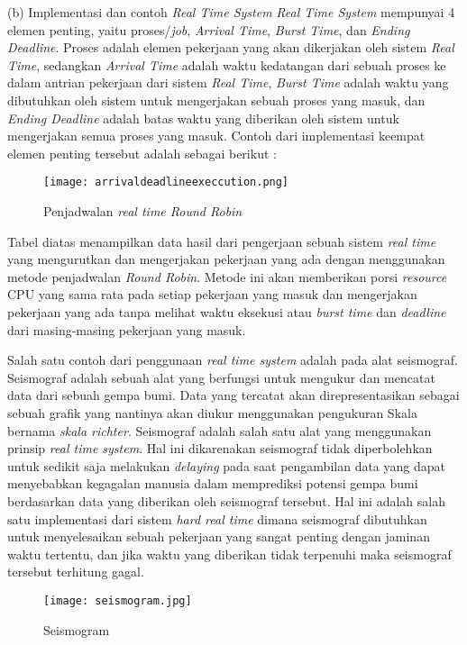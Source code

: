 \documentclass[a4paper,twoside]{article}
\begin{document}
\begin{enumerate}
		(b) Implementasi dan contoh {\it Real Time System}  \newline
		{\it Real Time System} mempunyai 4 elemen penting, yaitu proses/{\it job}, {\it Arrival Time}, {\it Burst Time}, dan {\it Ending Deadline}. Proses adalah elemen pekerjaan yang akan dikerjakan oleh sistem {\it Real Time}, sedangkan {\it Arrival Time} adalah waktu kedatangan dari sebuah proses ke dalam antrian pekerjaan dari sistem {\it Real Time}, {\it Burst Time} adalah waktu yang dibutuhkan oleh sistem untuk mengerjakan sebuah proses yang masuk, dan {\it Ending Deadline} adalah batas waktu yang diberikan oleh sistem untuk mengerjakan semua proses yang masuk.\newline
		Contoh dari implementasi keempat elemen penting tersebut adalah sebagai berikut : \newline
		\begin{center}
        \begin{figure}[!htbp]
            \centering
            \texttt{[image: arrivaldeadlineexeccution.png]}
            \caption{Penjadwalan {\it real time Round Robin}}
            \label{}
        \end{figure}
		\end{center}
		Tabel diatas menampilkan data hasil dari pengerjaan sebuah sistem {\it real time} yang mengurutkan dan mengerjakan pekerjaan yang ada dengan menggunakan metode penjadwalan {\it Round Robin}. Metode ini akan memberikan porsi {\it resource} CPU yang sama rata pada setiap pekerjaan yang masuk dan mengerjakan pekerjaan yang ada tanpa melihat waktu eksekusi atau {\it burst time} dan {\it deadline} dari masing-masing pekerjaan yang masuk.\newline
	
		Salah satu contoh dari penggunaan {\it real time system} adalah pada alat seismograf. Seismograf adalah sebuah alat yang berfungsi untuk mengukur dan mencatat data dari sebuah gempa bumi. Data yang tercatat akan direpresentasikan sebagai sebuah grafik yang nantinya akan diukur menggunakan pengukuran Skala bernama {\it skala richter}. Seismograf adalah salah satu alat yang menggunakan prinsip {\it real time system}. Hal ini dikarenakan seismograf tidak diperbolehkan untuk sedikit saja melakukan {\it delaying} pada saat pengambilan data yang dapat menyebabkan kegagalan manusia dalam memprediksi potensi gempa bumi berdasarkan data yang diberikan oleh seismograf tersebut. Hal ini adalah salah satu implementasi dari sistem {\it hard real time} dimana seismograf dibutuhkan untuk menyelesaikan sebuah pekerjaan yang sangat penting dengan jaminan waktu tertentu, dan jika waktu yang diberikan tidak terpenuhi maka seismograf tersebut terhitung gagal.\newpage
		\begin{center}
        \begin{figure}
            \centering
            \texttt{[image: seismogram.jpg]}
            \caption{Seismogram}
            \label{}
        \end{figure}
		\end{center}
		

\end{enumerate}
\end{document}
